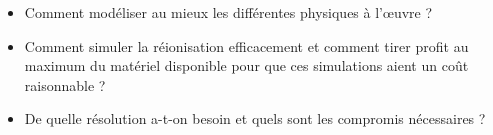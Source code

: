 \begin{itemize}
\item Comment modéliser au mieux les différentes physiques à l’œuvre ?
\item Comment simuler la réionisation efficacement et comment tirer profit au maximum du matériel disponible pour que ces simulations aient un coût raisonnable ?
\item De quelle résolution a-t-on besoin et quels sont les compromis nécessaires ?
\end{itemize}

%
%
%




